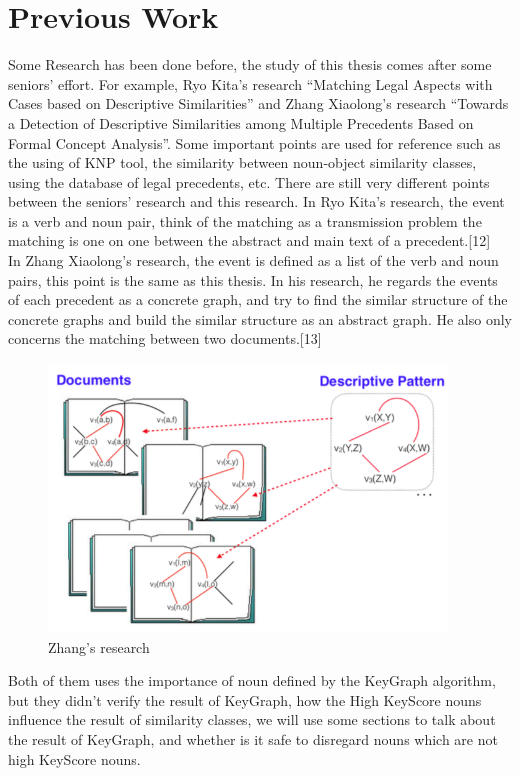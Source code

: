 \section{Previous Work}
Some Research has been done before, the study of this thesis comes after some seniors' effort. For example, Ryo Kita's research ``Matching Legal Aspects with Cases based on Descriptive Similarities'' and Zhang Xiaolong's research ``Towards a Detection of Descriptive Similarities among Multiple Precedents Based on Formal Concept Analysis''. Some important points are used for reference such as the using of KNP tool, the similarity between noun-object similarity classes, using the database of legal precedents, etc. There are still very different points between the seniors' research and this research.
In Ryo Kita's research, the event is a verb and noun pair, think of the matching as a transmission problem the matching is one on one between the abstract and main text of a precedent.[12]\\
In Zhang Xiaolong's research, the event is defined as a list of the verb and noun pairs, this point is the same as this thesis. In his research, he regards the events of each precedent as a concrete graph, and try to find the similar structure of the concrete graphs and build the similar structure as an abstract graph. He also only concerns the matching between two documents.[13]\\
\begin{figure}[!hbp]
\centering
\includegraphics[width=300pt]{./pictures/0103.png}
\caption{Zhang's research}
\end{figure}
Both of them uses the importance of noun defined by the KeyGraph algorithm, but they didn't verify the result of KeyGraph, how the High KeyScore nouns influence the result of similarity classes, we will use some sections to talk about the result of KeyGraph, and whether is it safe to disregard nouns which are not high KeyScore nouns.\\
